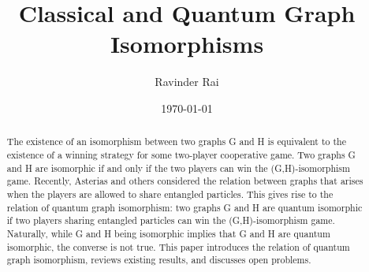 \documentclass[12pt]{article}
\title{\textbf{Classical and Quantum Graph Isomorphisms}}
\author{Ravinder Rai}
\date{\today}
\begin{document}
 

\maketitle

\begin{abstract}
The existence of an isomorphism between two graphs G and H is equivalent to the existence of a winning strategy for some two-player cooperative game. Two graphs G and H are isomorphic if and only if the two players can win the (G,H)-isomorphism game. Recently, Asterias and others considered the relation between graphs that arises when the players are allowed to share entangled particles. This gives rise to the relation of quantum graph isomorphism: two graphs G and H are quantum isomorphic if two players sharing entangled particles can win the (G,H)-isomorphism game. Naturally, while G and H being isomorphic implies that G and H are quantum isomorphic, the converse is not true. This paper introduces the relation of quantum graph isomorphism, reviews existing results, and discusses open problems. 
\end{abstract}

\newpage
\end{document}
